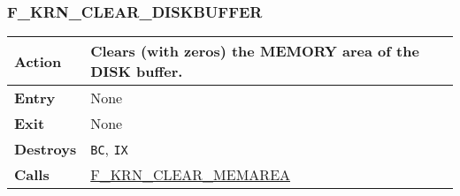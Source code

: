     \subsubsection{F\_KRN\_CLEAR\_DISKBUFFER}
    \label{func:fkrncleardiskbuffer}
    \begin{tabular}{l p{9cm}}
        \hline\textbf{Action}
        & Clears (with zeros) the \textbf{MEMORY} area of the \textbf{DISK}
        buffer.\\
        \hline\textbf{Entry} & None\\
        \hline\textbf{Exit} & None\\
        \hline\textbf{Destroys} & \texttt{BC}, \texttt{IX}\\
        \hline\textbf{Calls} & \hyperref[func:fkrnclearmemarea]{F\_KRN\_CLEAR\_MEMAREA}\\
        \hline
    \end{tabular}